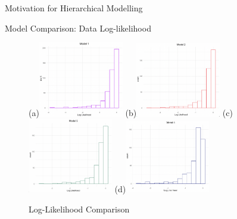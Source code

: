 \documentclass{beamer}
\begin{document}
\begin{frame}{Motivation for Hierarchical Modelling}
\begin{frame}{Model Comparison: Data Log-likelihood}
\begin{figure}[h!]
        \subfigure(a){\includegraphics[width=0.33\textwidth]{plots/model1_llm.png}} 
        \subfigure(b){\includegraphics[width=0.33\textwidth]{plots/model2_llm.png}} 
        \subfigure(c){\includegraphics[width=0.33\textwidth]{plots/model3_llm.png}}
        \subfigure(d){\includegraphics[width=0.33\textwidth]{plots/model4_llm.png}}
      
        \caption{Log-Likelihood Comparison}
      
   
      \end{figure}  
\end{frame}


\end{frame}
\end{document}

